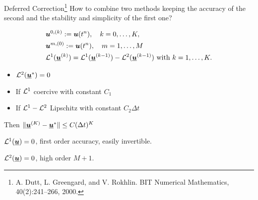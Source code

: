 \documentclass[9pt,compress,t,aspectratio=169]{beamer}
\begin{document}
\begin{frame}{Deferred Correction\footnote{A. Dutt, L. Greengard, and V. Rokhlin. BIT Numerical Mathematics, 40(2):241–266,
			2000.}}
	How to combine two methods keeping the accuracy of the second and the stability and simplicity of the first one?
	
	\begin{minipage}{0.58\textwidth}
		\begin{equation*}\label{DeC_method}
			\begin{split}
				&\boldsymbol{u}^{0,(k)}:=\boldsymbol{u}(t^n), \quad k=0,\dots, K,\\
				&\boldsymbol{u}^{m,(0)}:=\boldsymbol{u}(t^n),\quad m=1,\dots, M\\
				&\mathcal{L}^1(\underline{\boldsymbol{u}}^{(k)})=\mathcal{L}^1(\underline{\boldsymbol{u}}^{(k-1)})-\mathcal{L}^2(\underline{\boldsymbol{u}}^{(k-1)})\text{ with }k=1,\dots,K.
			\end{split}
		\end{equation*}\vspace{-4mm}
\begin{theorem}
	\begin{itemize}
		\item $\mathcal{L}^2(\underline{\boldsymbol{u}}^*)=0$
		\item If $\mathcal{L}^1$ coercive with constant $C_1$
		\item If $\mathcal{L}^1-\mathcal{L}^2$ Lipschitz with constant $C_2 \Delta t$
	\end{itemize}
	Then $\lVert \underline{\boldsymbol{u}}^{(K)}-\underline{\boldsymbol{u}}^*\rVert \leq C(\Delta t)^K$
\end{theorem}
	\end{minipage} \hfill
	\begin{minipage}{0.4\textwidth}
		\begin{itemize}
			{
				\item $\mathcal{L}^1(\underline{\boldsymbol{u}})=0$, first order accuracy, easily invertible.
				\item $\mathcal{L}^2(\underline{\boldsymbol{u}})=0$, high order $M+1$.
			}
		\end{itemize}
	\end{minipage}
	
\end{frame}
\end{document}
